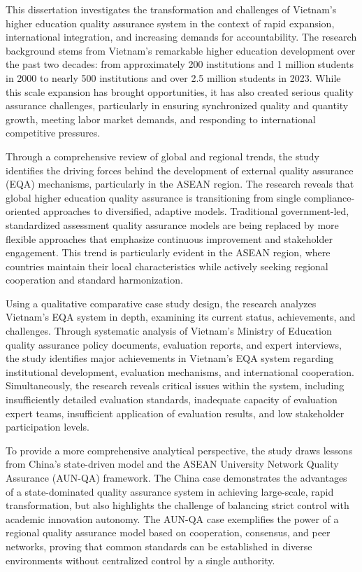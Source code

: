 
\begin{eabstract}
This dissertation investigates the transformation and challenges of Vietnam's higher education quality assurance system in the context of rapid expansion, international integration, and increasing demands for accountability. The research background stems from Vietnam's remarkable higher education development over the past two decades: from approximately 200 institutions and 1 million students in 2000 to nearly 500 institutions and over 2.5 million students in 2023. While this scale expansion has brought opportunities, it has also created serious quality assurance challenges, particularly in ensuring synchronized quality and quantity growth, meeting labor market demands, and responding to international competitive pressures.

Through a comprehensive review of global and regional trends, the study identifies the driving forces behind the development of external quality assurance (EQA) mechanisms, particularly in the ASEAN region. The research reveals that global higher education quality assurance is transitioning from single compliance-oriented approaches to diversified, adaptive models. Traditional government-led, standardized assessment quality assurance models are being replaced by more flexible approaches that emphasize continuous improvement and stakeholder engagement. This trend is particularly evident in the ASEAN region, where countries maintain their local characteristics while actively seeking regional cooperation and standard harmonization.

Using a qualitative comparative case study design, the research analyzes Vietnam's EQA system in depth, examining its current status, achievements, and challenges. Through systematic analysis of Vietnam's Ministry of Education quality assurance policy documents, evaluation reports, and expert interviews, the study identifies major achievements in Vietnam's EQA system regarding institutional development, evaluation mechanisms, and international cooperation. Simultaneously, the research reveals critical issues within the system, including insufficiently detailed evaluation standards, inadequate capacity of evaluation expert teams, insufficient application of evaluation results, and low stakeholder participation levels.

To provide a more comprehensive analytical perspective, the study draws lessons from China's state-driven model and the ASEAN University Network Quality Assurance (AUN-QA) framework. The China case demonstrates the advantages of a state-dominated quality assurance system in achieving large-scale, rapid transformation, but also highlights the challenge of balancing strict control with academic innovation autonomy. The AUN-QA case exemplifies the power of a regional quality assurance model based on cooperation, consensus, and peer networks, proving that common standards can be established in diverse environments without centralized control by a single authority.


\end{eabstract}
